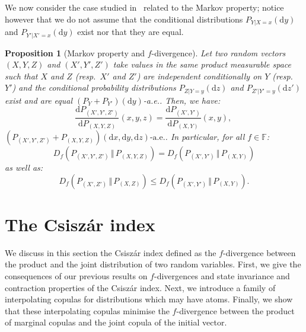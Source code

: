 \documentclass[12pt]{article}
\newcommand{\F}{{\mathbb F}}
\newcommand{\rd}{\mathrm{d}}
\theoremstyle{plain}
\newtheorem{prop}[theo]{Proposition}
\theoremstyle{remark}
\begin{document}
We now consider the case studied in~\citet[Theorem~7.4]{polyanskiy2025information}
related to the Markov property; notice however that we do not assume
that the conditional distributions $P_{Y| X=x}(\rd y)$ and $P_{Y'| X'=x}(\rd y)$ exist nor that they are equal.


\begin{prop}[Markov property and $f$-divergence]
\label{prop:markov}
Let two random vectors $(X,Y,Z)$ and $(X',Y',Z')$ take values in
the same product measurable space such that $X$ and $Z$
(resp.\  $X'$ and  $Z'$) are  independent conditionally  on $Y$  (resp.\
$Y'$) and  the conditional probability distributions  $P_{Z|Y=y}(\rd z)$
and      $P_{Z'|Y'=y}(\rd     z')$      exist     and      are     equal
$(P_Y+P_{Y'})(\rd y)$-a.e.. Then, we have:
\begin{equation}
   \label{eq:densite-Markov}
  \frac{\rd P_{(X', Y', Z')}}{\rd P_{(X,Y,Z)}}(x,y,z)=
      \frac{\rd P_{(X', Y')}}{\rd P_{(X,Y)}}(x,y),
          \,
\end{equation}
$ \left(P_{(X', Y', Z')}+ P_{(X,Y,Z)}\right)(\rd x, \rd y,
              \rd z)\text{-a.e.}$. In particular, for all $f\in \F$:
$$
D_f\left(P_{(X', Y', Z')} \,\Vert \,  P_{(X,Y,Z)}\right)=
  D_f\left(P_{(X', Y')} \, \Vert \,  P_{(X,Y)}\right)
  $$ as well as:
\begin{equation}
   \label{eq:ineg-Df-Markov}
D_f\left(P_{(X', Z')} \,\Vert \,  P_{(X,Z)}\right)\leq
  D_f\left(P_{(X', Y')} \, \Vert \,  P_{(X,Y)}\right).
\end{equation}
\end{prop}



\section{The Csisz\'ar index}
\label{sec:csiszar_index}

We discuss in this section the Csisz\'ar index defined as the $f$-divergence between the product and the joint distribution of two random variables. First, we give the consequences of our previous results on $f$-divergences and state invariance and contraction properties of the Csisz\'ar index. Next, we introduce a family of interpolating copulas for distributions which may have atoms. Finally, we show that these interpolating copulas minimise the $f$-divergence between the product of marginal copulas and the joint copula of the initial vector.
\end{document}
